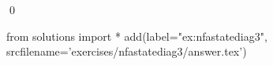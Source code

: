 
\begin{ex} 
  \label{ex:nfastatediag3}
  
  \qed
\end{ex} 
\begin{python0}
from solutions import *
add(label="ex:nfastatediag3",
    srcfilename='exercises/nfastatediag3/answer.tex') 
\end{python0}
